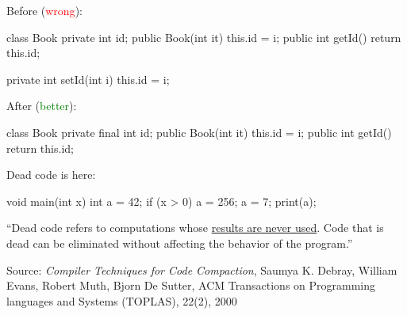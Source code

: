 \documentclass{article}
\begin{document}

\begin{multicols}{2}
Before (\textcolor{red}{wrong}):\par
{\small\begin{ffcode}
class Book
  private int id;
  public Book(int it)
    this.id = i;
  public int getId()
    return this.id;

  private int setId(int i)
    this.id = i;
\end{ffcode}
}
\par\columnbreak\par
After (\textcolor{green}{better}):\par
{\small\begin{ffcode}
class Book
  private final int id;
  public Book(int it)
    this.id = i;
  public int getId()
    return this.id;
\end{ffcode}
}
\end{multicols}
\plush{}


\begin{multicols}{2}
Dead code is here:\par
{\small\begin{ffcode}
void main(int x) {
  int a = 42;
  if (x > 0) {
    a = 256;
  }
  a = 7;
  print(a);
}
\end{ffcode}
}
\par\columnbreak\par
``Dead code refers to computations whose \ul{results are never used}. Code that is dead can be eliminated without affecting the behavior of the program.''\par
{\scriptsize Source: \textit{Compiler Techniques for Code Compaction}, Saumya K. Debray, William Evans, Robert Muth, Bjorn De Sutter, ACM Transactions on Programming languages and Systems (TOPLAS), 22(2), 2000 \par}
\end{multicols}
\plush{}
\end{document}
